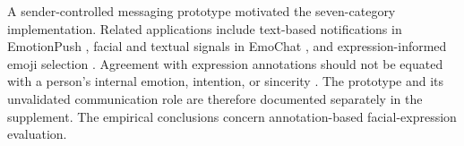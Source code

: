 A sender-controlled messaging prototype motivated the seven-category implementation. Related applications include text-based notifications in EmotionPush \cite{wang2016emotionpush}, facial and textual signals in EmoChat \cite{chong2019emochat}, and expression-informed emoji selection \cite{liu2019selfawareness}. Agreement with expression annotations should not be equated with a person's internal emotion, intention, or sincerity \cite{barrett2019emotions}. The prototype and its unvalidated communication role are therefore documented separately in the supplement. The empirical conclusions concern annotation-based facial-expression evaluation.
